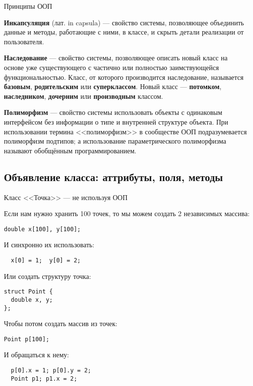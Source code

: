 \begin{frame}[t]{Принципы ООП}

\textbf{Инкапсуляция} (лат. in capsula) --- свойство системы, позволяющее объединить данные и методы, 
работающие с ними, в классе, и скрыть детали реализации от пользователя.

\textbf{Наследование} --- свойство системы, позволяющее описать новый класс на основе 
уже существующего с частично или полностью заимствующейся функциональностью. 
Класс, от которого производится наследование, называется 
\textbf{базовым}, \textbf{родительским} или \textbf{суперклассом}. 
Новый класс --- \textbf{потомком}, \textbf{наследником}, \textbf{дочерним} или \textbf{производным} классом.

\textbf{Полиморфизм} --- свойство системы использовать объекты с одинаковым интерфейсом без информации о типе и внутренней структуре объекта.
При использовании термина <<полиморфизм>> в сообществе ООП подразумевается полиморфизм подтипов; 
а использование параметрического полиморфизма называют обобщённым программированием.

\end{frame}
                     
\subsection{Объявление класса: аттрибуты, поля, методы}
\begin{frame}[t,fragile]{Класс <<Точка>> --- не используя ООП}

Если нам нужно хранить 100 точек, то мы можем создать 2 независимых массива:
\begin{lstlisting}
double x[100], y[100];
\end{lstlisting}

И синхронно их использовать:
\begin{lstlisting}
  x[0] = 1;  y[0] = 2;
\end{lstlisting}

Или создать структуру точка:
\begin{lstlisting}
struct Point {
  double x, y;
};
\end{lstlisting}

Чтобы потом создать массив из точек:
\begin{lstlisting}
Point p[100];
\end{lstlisting}

И обращаться к нему:
\begin{lstlisting}
  p[0].x = 1; p[0].y = 2;
  Point p1; p1.x = 2;
\end{lstlisting}
\end{frame}

